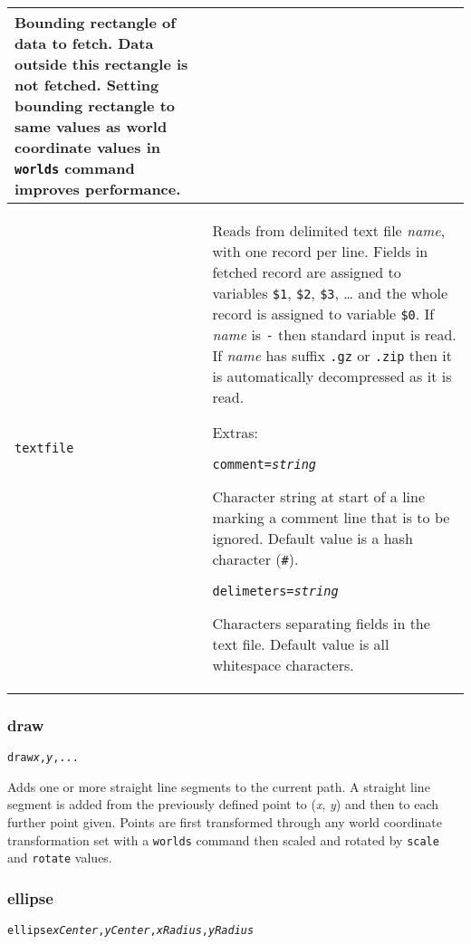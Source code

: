 \begin{longtable}{|p{3cm}|p{10cm}|}
Bounding rectangle of data to fetch.  Data outside this rectangle is
not fetched.  Setting bounding rectangle to same values as world
coordinate values in \texttt{worlds} command improves performance. \\

\hline

\texttt{textfile} &
Reads from delimited text file \textit{name}, with one
record per line.  Fields in fetched record
are assigned to variables
\texttt{\$1}, \texttt{\$2}, \texttt{\$3}, \dots
and the whole record is assigned to variable
\texttt{\$0}.
If \textit{name} is \texttt{-} then standard input is read.
If \textit{name} has suffix \texttt{.gz} or \texttt{.zip}
then it is automatically decompressed as it is read.

\vspace{10pt}
Extras:

\texttt{comment=\textit{string}}

Character string at start of a line marking a comment line that
is to be ignored.  Default value is a hash character (\texttt{\#}).

\vspace{10pt}
\texttt{delimeters=\textit{string}}

Characters separating fields in the text file.  Default value
is all whitespace characters. \\

\end{longtable}

\subsubsection{draw}

\begin{alltt}
draw \textit{x}, \textit{y}, ...
\end{alltt}

Adds one or more straight line segments to the current path.
A straight line segment is added from the previously defined point
to (\textit{x}, \textit{y}) and then to each further point given.
Points are first transformed through any world coordinate
transformation set with a \texttt{worlds} command
then scaled and rotated by \texttt{scale}
and \texttt{rotate} values.

\subsubsection{ellipse}

\begin{alltt}
ellipse \textit{xCenter}, \textit{yCenter}, \textit{xRadius}, \textit{yRadius}
\end{alltt}

